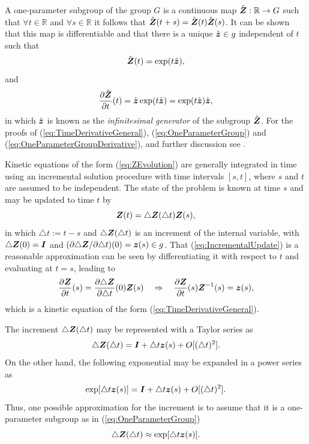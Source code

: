 \documentclass[12pt]{article}
\newcommand{\mbb}[1]{\mathbb{#1}}
\begin{document}
A one-parameter subgroup of the group $G$ is a continuous map
$\hat{\bZ} : \mbb{R} \to G$ such that $\forall t \in \mbb{R}$ and
$\forall s \in \mbb{R}$ it follows that $\hat{{\boldsymbol{Z}}}(t+s) =
\hat{{\boldsymbol{Z}}}(t)\hat{{\boldsymbol{Z}}}(s)$. It can be shown that this map is
differentiable and that there is a unique $\hat{{\boldsymbol{z}}} \in g$
independent of $t$ such that
\begin{equation} \label{eq:OneParameterGroup}
  \hat{{\boldsymbol{Z}}}(t) = \exp(t \hat{{\boldsymbol{z}}}),
\end{equation}
and
\begin{equation} \label{eq:OneParameterGroupDerivative}
  \frac{\partial \hat{{\boldsymbol{Z}}}}{\partial t}(t) =
  \hat{{\boldsymbol{z}}} \exp(t \hat{{\boldsymbol{z}}}) = \exp(t \hat{{\boldsymbol{z}}}) \hat{{\boldsymbol{z}}},
\end{equation}
in which $\hat{{\boldsymbol{z}}}$ is known as the \emph{infinitesimal generator} of
the subgroup $\hat{{\boldsymbol{Z}}}$. For the proofs of
(\ref{eq:TimeDerivativeGeneral}), (\ref{eq:OneParameterGroup}) and
(\ref{eq:OneParameterGroupDerivative}), and further discussion see
\citet*{Procesi:2006,Sepanski:2007,Kosmann-Schwarzbach:2009}.

Kinetic equations of the form (\ref{eq:ZEvolution}) are generally
integrated in time using an incremental solution procedure with time
intervals $[s, t]$, where $s$ and $t$ are assumed to be
independent. The state of the problem is known at time $s$ and may be
updated to time $t$ by
\begin{equation} \label{eq:IncrementalUpdate}
  {\boldsymbol{Z}}(t) = \triangle {\boldsymbol{Z}}(\triangle t) {\boldsymbol{Z}}(s),
\end{equation}
in which $\triangle t := t-s$ and $\triangle {\boldsymbol{Z}}(\triangle t)$ is an
increment of the internal variable, with $\triangle {\boldsymbol{Z}}(0) = {\boldsymbol{I}}$ and
$(\partial \triangle {\boldsymbol{Z}} / \partial \triangle t)(0) = {\boldsymbol{z}}(s) \in
g$. That (\ref{eq:IncrementalUpdate}) is a reasonable
approximation can be seen by differentiating it
with respect to $t$ and evaluating at $t = s$, leading to
\begin{equation}\label{eq:EvolutionFromUpdate}
  \frac{\partial {\boldsymbol{Z}}}{\partial t}(s) =
  \frac{\partial \triangle {\boldsymbol{Z}}}{\partial \triangle t}(0) {\boldsymbol{Z}}(s)
  \quad
  \Rightarrow
  \quad
  \frac{\partial {\boldsymbol{Z}}}{\partial t}(s) {\boldsymbol{Z}}^{-1}(s) = {\boldsymbol{z}}(s),
\end{equation}
which is a kinetic equation of the form (\ref{eq:TimeDerivativeGeneral}).

The increment $\triangle {\boldsymbol{Z}}(\triangle t)$ may be represented with a Taylor
series as
\begin{equation}
  \triangle {\boldsymbol{Z}}(\triangle t)  =
  {\boldsymbol{I}} + \triangle t {\boldsymbol{z}}(s) + O[(\triangle t)^2].
  \label{eq:TaylorSeries}
\end{equation}
On the other hand, the following exponential may be expanded in a
power series as
\begin{equation}
  \exp[\triangle t {\boldsymbol{z}}(s)] =
  {\boldsymbol{I}} + \triangle t {\boldsymbol{z}}(s) + O[(\triangle t)^2].
  \label{eq:PowerSeries}
\end{equation}
Thus, one possible approximation for the increment is to assume
that it is a one-parameter subgroup as in (\ref{eq:OneParameterGroup})
\begin{equation}
  \triangle {\boldsymbol{Z}}(\triangle t) \approx
  \exp[\triangle t {\boldsymbol{z}}(s)].
  \label{eq:Increment}
\end{equation}
\end{document}
